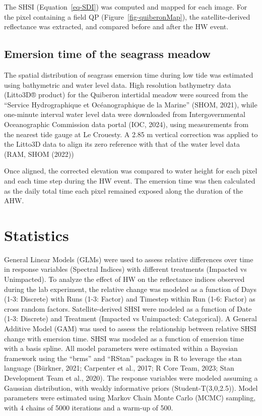 \documentclass[
  letterpaper,
  DIV=11,
  numbers=noendperiod]{scrartcl}
\begin{document}
The SHSI (Equation~\ref{eq-SDI}) was computed and mapped for each image.
For the pixel containing a field QP (Figure~\ref{fig-quiberonMap}), the
satellite-derived reflectance was extracted, and compared before and
after the HW event.

\subsection{Emersion time of the seagrass
meadow}\label{emersion-time-of-the-seagrass-meadow}

The spatial distribution of seagrass emersion time during low tide was
estimated using bathymetric and water level data. High resolution
bathymetry data (Litto3D® product) for the Quiberon intertidal meadow
were sourced from the ``Service Hydrographique et Océanographique de la
Marine'' (SHOM, 2021), while one-minute interval water level data were
downloaded from Intergovernmental Oceanographic Commission data portal
(IOC, 2024), using measurements from the nearest tide gauge at Le
Crouesty. A 2.85 m vertical correction was applied to the Litto3D data
to align its zero reference with that of the water level data (RAM, SHOM
(2022))

Once aligned, the corrected elevation was compared to water height for
each pixel and each time step during the HW event. The emersion time was
then calculated as the daily total time each pixel remained exposed
along the duration of the AHW.

\section{Statistics}\label{statistics}

General Linear Models (GLMs) were used to assess relative differences
over time in response variables (Spectral Indices) with different
treatments (Impacted vs Unimpacted). To analyze the effect of HW on the
reflectance indices observed during the lab experiment, the relative
change was modeled as a function of Days (1-3: Discrete) with Runs (1-3:
Factor) and Timestep within Run (1-6: Factor) as cross random factors.
Satellite-derived SHSI were modeled as a function of Date (1-3:
Discrete) and Treatment (Impacted vs Unimpacted: Categorical). A General
Additive Model (GAM) was used to assess the relationship between
relative SHSI change with emersion time. SHSI was modeled as a function
of emersion time with a basis spline. All model parameters were
estimated within a Bayesian framework using the ``brms'' and ``RStan''
packages in R to leverage the stan language (Bürkner, 2021; Carpenter et
al., 2017; R Core Team, 2023; Stan Development Team et al., 2020). The
response variables were modeled assuming a Gaussian distribution, with
weakly informative priors (Student-T(3,0,2.5)). Model parameters were
estimated using Markov Chain Monte Carlo (MCMC) sampling, with 4 chains
of 5000 iterations and a warm-up of 500.
\end{document}
